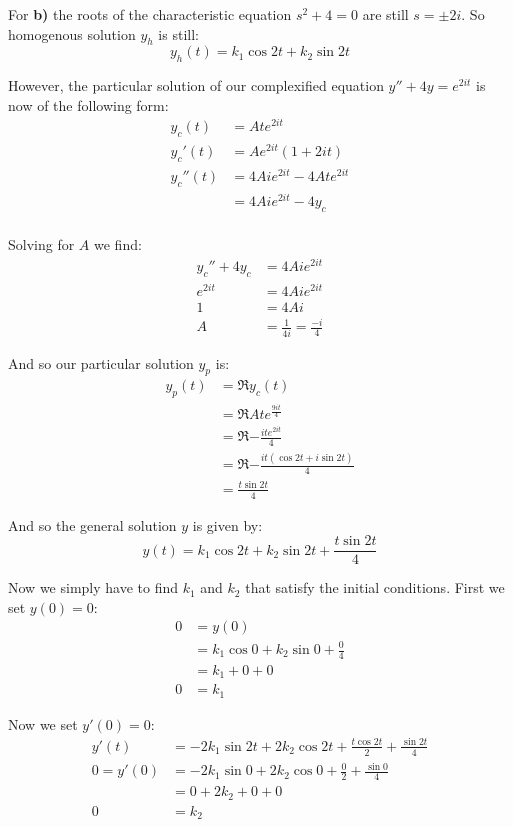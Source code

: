 \documentclass{article}
\begin{document}
For \textbf{b)} the roots of the characteristic equation $s^2+4=0$ are still $s=\pm 2i$. So homogenous solution $y_h$ is still:
\begin{equation*}
  y_h(t)=k_1\cos2t+k_2\sin2t
\end{equation*}

However, the particular solution of our complexified equation $y''+4y=e^{2it}$ is now of the following form:
\begin{align*}
  y_c(t)&=Ate^{2it}\\
  y_c'(t)&=Ae^{2it}(1+2it)\\
  y_c''(t)&=4Aie^{2it}-4Ate^{2it}\\
  &=4Aie^{2it}-4y_c\\
\end{align*}

Solving for $A$ we find:
\begin{align*}
  y_c''+4y_c&=4Aie^{2it}\\
  e^{2it}&=4Aie^{2it}\\
  1&=4Ai\\
  A&=\frac{1}{4i}=\frac{-i}{4}
\end{align*}

And so our particular solution $y_p$ is:
\begin{align*}
  y_p(t)&=\Re{y_c(t)}\\
  &=\Re{Ate^{\frac{9it}{4}}}\\
  &=\Re{-\frac{ite^{2it}}{4}}\\
  &=\Re{-\frac{it(\cos 2t+i\sin2t)}{4}}\\
  &=\frac{t\sin2t}{4}
\end{align*}

And so the general solution $y$ is given by:
\begin{equation*}
  y(t)=k_1\cos2t+k_2\sin2t+\frac{t\sin2t}{4}
\end{equation*}

Now we simply have to find $k_1$ and $k_2$ that satisfy the initial conditions. First we set $y(0)=0$:
\begin{align*}
  0&=y(0)\\
  &=k_1\cos0+k_2\sin0+\frac{0}{4}\\
  &=k_1+0+0\\
  0&=k_1
\end{align*}

Now we set $y'(0)=0$:
\begin{align*}
  y'(t)&=-2k_1\sin2t+2k_2\cos2t+\frac{t\cos2t}{2}+\frac{\sin2t}{4}\\
  0=y'(0)&=-2k_1\sin0+2k_2\cos0+\frac{0}{2}+\frac{\sin0}{4}\\
  &=0+2k_2+0+0\\
 0&=k_2
\end{align*}
\end{document}

